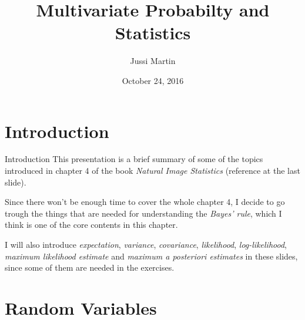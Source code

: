 \documentclass{beamer}
\title[Multivariate Probabilty and Statistics]{Multivariate Probabilty and Statistics}
\author{Jussi Martin}
\date{October 24, 2016}
\begin{document}
\begin{frame}
  \titlepage
\end{frame}


%
%
%
%
%

\section{Introduction}

\begin{frame}{Introduction}
  This presentation is a brief summary of some of the topics introduced in
  chapter 4 of the book \emph{Natural Image Statistics} (reference at
  the last slide).

  Since there won't be enough time to cover the whole chapter 4, I decide to go
  trough the things that are needed for understanding the \emph{Bayes' rule},
  which I think is one of the core contents in this chapter.

  I will also introduce \emph{expectation}, \emph{variance}, \emph{covariance},
  \emph{likelihood}, \emph{log-likelihood}, \emph{maximum likelihood estimate}
  and \emph{maximum a posteriori estimates} in these slides, since some of them
  are needed in the exercises.
\end{frame}

\section{Random Variables}
\end{document}
